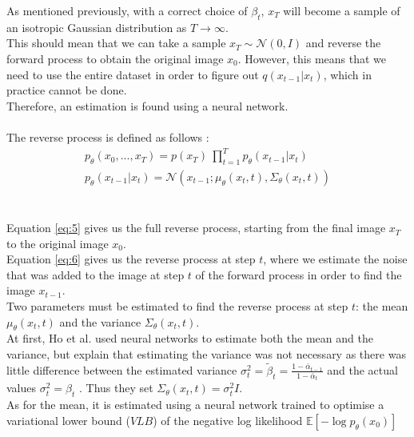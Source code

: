 \documentclass{article}
\begin{document}
As mentioned previously, with a correct choice of $\beta_t$, $x_T$ will become a sample of an isotropic Gaussian distribution as $T \rightarrow \infty$. \cite{nichol2021improved, sohldickstein2015deep} \\
This should mean that we can take a sample $x_T \sim \mathcal{N}(0, I)$ and reverse the forward process to obtain the original image $x_0$. 
However, this means that we need to use the entire dataset in order to figure out $q(x_{t-1} | x_t)$, which in practice cannot be done. \cite{nichol2021improved} \\
Therefore, an estimation is found using a neural network. \cite{nichol2021improved}
\\\\
The reverse process is defined as follows \cite{ho2020denoising}:
\begin{gather}
  p_{\theta}(x_0, ..., x_T) = p(x_T) \: \prod_{t=1}^T p_{\theta}(x_{t-1} | x_t) \label{eq:5} \\
  p_{\theta}(x_{t-1} | x_t) = \mathcal{N}(x_{t-1}; \mu_{\theta}(x_t, t), \Sigma_{\theta}(x_t, t)) \label{eq:6}
\end{gather}
\\\\
Equation \ref{eq:5} gives us the full reverse process, starting from the final image $x_T$ to the original image $x_0$. \\
Equation \ref{eq:6} gives us the reverse process at step $t$, where we estimate the noise that was added to the image at step $t$ of the forward process in order to find the image $x_{t-1}$. \\
Two parameters must be estimated to find the reverse process at step $t$: the mean $\mu_{\theta}(x_t, t)$ and the variance $\Sigma_{\theta}(x_t, t)$. \\
At first, Ho et al. \cite{ho2020denoising} used neural networks to estimate both the mean and the variance, but explain that estimating the variance was not necessary as there was little difference between the estimated variance $\sigma_t^2 = \tilde{\beta}_t = \frac{1 - \bar{\alpha}_{t-1}}{1 - \bar{\alpha}_t}$ and the actual values $\sigma_t^2 = \beta_t$ \cite{ho2020denoising}. Thus they set $\Sigma_{\theta}(x_t, t) = \sigma_t^2 I$. \\
As for the mean, it is estimated using a neural network trained to optimise a variational lower bound ($VLB$) of the negative log likelihood $\mathbb{E}[- \log p_{\theta} (x_0)]$ \cite{ho2020denoising}
\end{document}
